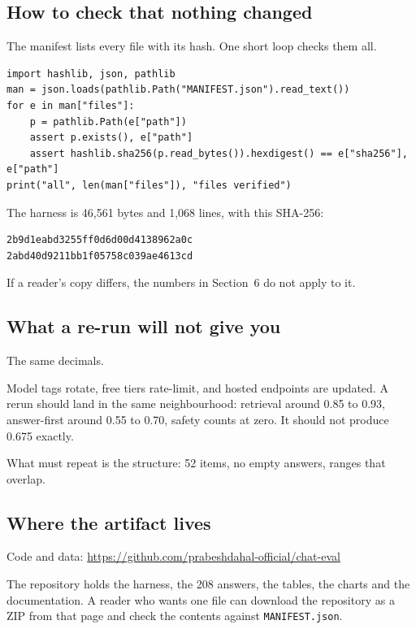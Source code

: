 \documentclass[11pt,a4paper]{article}
\begin{document}
\subsection{How to check that nothing changed}

The manifest lists every file with its hash. One short loop checks them all.

\begin{verbatim}
import hashlib, json, pathlib
man = json.loads(pathlib.Path("MANIFEST.json").read_text())
for e in man["files"]:
    p = pathlib.Path(e["path"])
    assert p.exists(), e["path"]
    assert hashlib.sha256(p.read_bytes()).hexdigest() == e["sha256"], e["path"]
print("all", len(man["files"]), "files verified")
\end{verbatim}

The harness is 46,561 bytes and 1,068 lines, with this SHA-256:

\begin{verbatim}
2b9d1eabd3255ff0d6d00d4138962a0c
2abd40d9211bb1f05758c039ae4613cd
\end{verbatim}

If a reader's copy differs, the numbers in Section~6 do not apply to it.

\subsection{What a re-run will not give you}

The same decimals.

Model tags rotate, free tiers rate-limit, and hosted endpoints are updated. A rerun should land in the same neighbourhood: retrieval around 0.85 to 0.93, answer-first around 0.55 to 0.70, safety counts at zero. It should not produce 0.675 exactly.

What must repeat is the structure: 52 items, no empty answers, ranges that overlap.

\subsection{Where the artifact lives}

Code and data: \url{https://github.com/prabeshdahal-official/chat-eval}

The repository holds the harness, the 208 answers, the tables, the charts and the documentation. A reader who wants one file can download the repository as a ZIP from that page and check the contents against \texttt{MANIFEST.json}.
\end{document}
